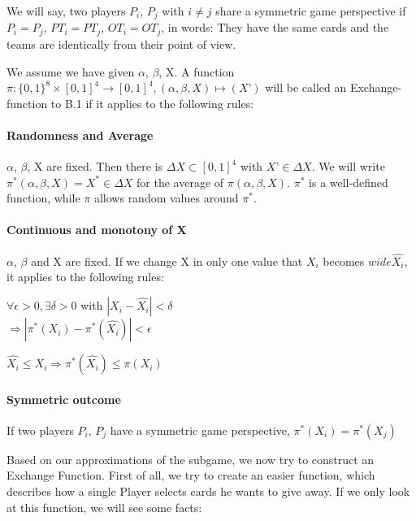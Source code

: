 \begin{definition}
We will say, two players $P_i$, $P_j$ with  $i \neq j$ share a symmetric game perspective if $P_i = P_j$, $PT_i = PT_j$, $OT_i = OT_j$, in words: They have the same cards and the teams are identically from their point of view. 
\end{definition}
\begin{definition}
We assume we have given $\alpha$, $\beta$, X. A function $\pi: \{0,1\}^8 \times [0,1]^4 \to [0,1]^4, (\alpha, \beta, X) \mapsto (X’)$ will be called an Exchange-function to B.1  if it applies to the following rules:
\paragraph{Randomness and Average}
$\alpha$, $\beta$, X are fixed. Then there is $\Delta X \subset [0,1]^4$ with $X’ \in \Delta X$. We will write $\pi^* (\alpha, \beta, X) = X^* \in \Delta X$ for the average of $\pi(\alpha, \beta, X)$. $\pi^*$ is a well-defined function, while $\pi$ allows random values around $\pi^*$.
\paragraph{Continuous and monotony of X}
$\alpha$, $\beta$ and X are fixed. If we change X in only one value that $X_i$ becomes $wide\hat{X_i}$, it applies to the following rules:
\begin{axioms}[(C1)]
\item $\forall \epsilon > 0, \exists \delta > 0$ with $| X_i - \widehat{X_i}| < \delta$ \\$\Rightarrow | \pi^*(X_i) - \pi^*(\widehat{X_i}) | < \epsilon $
\item $\widehat{X_i} \leq X_i \Rightarrow \pi^*(\widehat{X_i}) \leq \pi(X_i)$
\end{axioms}

\paragraph{Symmetric outcome}
If two players $P_i$, $P_j$ have a symmetric game perspective, $\pi^*(X_i) = \pi^*(X_j)$
\end{definition}

Based on our approximations of the subgame, we now try to construct an Exchange Function. First of all, we try to create an easier function, which describes how a single Player selects cards he wants to give away. If we only look at this function, we will see some facts:

